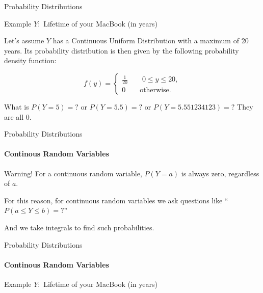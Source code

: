 \documentclass{beamer}\usepackage[]{graphicx}\usepackage[]{color}
\begin{document}
\begin{darkframes}
\begin{frame}[label=lists]{Probability Distributions}
		\begin{exampleblock}{Example}
		$Y:$ Lifetime of your MacBook (in years) \newline \pause
		
		Let's assume $Y$ has a \alert{Continuous Uniform Distribution} with a maximum of 20 years. Its probability distribution is then given by the following probability density function: \newline  \pause
		
		$$ f(y) = 
			\begin{cases}
				\frac{1}{20} \qquad 0 \leq y \leq 20, \\
				0 \qquad   \text{otherwise.}
			\end{cases}
		$$  \pause
		
		What is $P(Y=5)=?$ or $P(Y=5.5)=?$ or $P(Y=5.551234123)=?$ \newline  \pause
		They are all 0.
		
		
		\end{exampleblock}
			
	\end{frame}





	\begin{frame}[label=lists]{Probability Distributions}
		\framesubtitle{Continous Random Variables} 
	
		\begin{alertblock}{Warning!}
        For a continuous random variable, $P(Y=a)$ is always zero, regardless of $a$. \newline 
      \end{alertblock}  \pause
      
      For this reason, for continuous random variables we ask questions like ``$P(a \leq Y \leq b)=?$'' \newline \pause
      
      And we take integrals to find such probabilities.
			
	\end{frame}


	\begin{frame}[label=lists]{Probability Distributions}
		\framesubtitle{Continous Random Variables} 

		\begin{exampleblock}{Example}
		$Y:$ Lifetime of your MacBook (in years) \newline \pause
		

\end{exampleblock}
\end{frame}
\end{darkframes}
\end{document}
